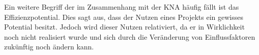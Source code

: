 Ein weitere Begriff der im Zusammenhang mit der \gls{KNA} häufig fällt ist das Effizienzpotential. Dies sagt aus, dass der Nutzen eines Projekts ein gewisses Potential besitzt. Jedoch wird dieser Nutzen relativiert, da er in Wirklichkeit noch nicht realisiert wurde und sich durch die Veränderung von Einflussfaktoren zukünftig noch ändern kann.

